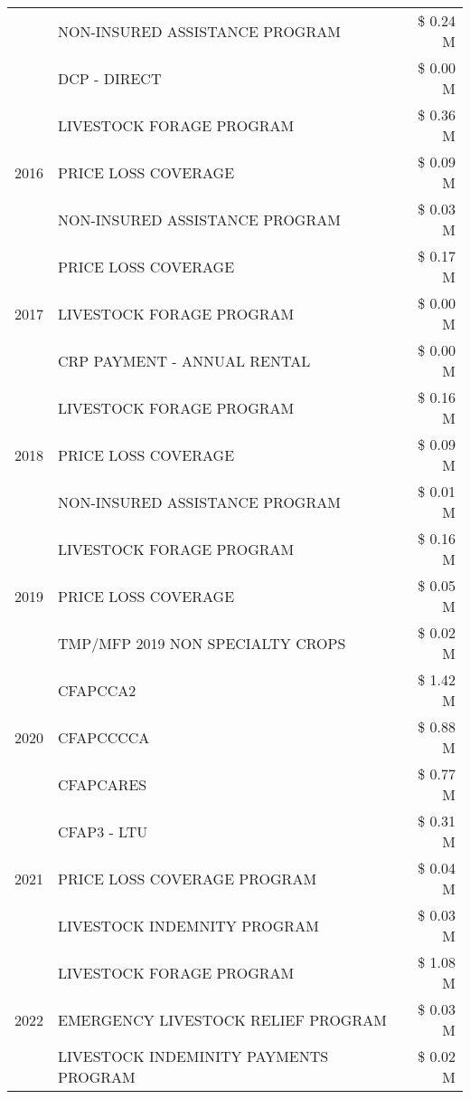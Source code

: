 \begin{tabular}{llr}
 & NON-INSURED ASSISTANCE PROGRAM & \$ 0.24 M \\
 & DCP - DIRECT & \$ 0.00 M \\
\cline{1-3}
\multirow[t]{3}{*}{2016} & LIVESTOCK FORAGE PROGRAM & \$ 0.36 M \\
 & PRICE LOSS COVERAGE & \$ 0.09 M \\
 & NON-INSURED ASSISTANCE PROGRAM & \$ 0.03 M \\
\cline{1-3}
\multirow[t]{3}{*}{2017} & PRICE LOSS COVERAGE & \$ 0.17 M \\
 & LIVESTOCK FORAGE PROGRAM & \$ 0.00 M \\
 & CRP PAYMENT - ANNUAL RENTAL & \$ 0.00 M \\
\cline{1-3}
\multirow[t]{3}{*}{2018} & LIVESTOCK FORAGE PROGRAM & \$ 0.16 M \\
 & PRICE LOSS COVERAGE & \$ 0.09 M \\
 & NON-INSURED ASSISTANCE PROGRAM & \$ 0.01 M \\
\cline{1-3}
\multirow[t]{3}{*}{2019} & LIVESTOCK FORAGE PROGRAM & \$ 0.16 M \\
 & PRICE LOSS COVERAGE & \$ 0.05 M \\
 & TMP/MFP 2019 NON SPECIALTY CROPS & \$ 0.02 M \\
\cline{1-3}
\multirow[t]{3}{*}{2020} & CFAPCCA2 & \$ 1.42 M \\
 & CFAPCCCCA & \$ 0.88 M \\
 & CFAPCARES & \$ 0.77 M \\
\cline{1-3}
\multirow[t]{3}{*}{2021} & CFAP3 - LTU & \$ 0.31 M \\
 & PRICE LOSS COVERAGE PROGRAM & \$ 0.04 M \\
 & LIVESTOCK INDEMNITY PROGRAM & \$ 0.03 M \\
\cline{1-3}
\multirow[t]{3}{*}{2022} & LIVESTOCK FORAGE PROGRAM & \$ 1.08 M \\
 & EMERGENCY LIVESTOCK RELIEF PROGRAM & \$ 0.03 M \\
 & LIVESTOCK INDEMINITY PAYMENTS PROGRAM & \$ 0.02 M \\
\cline{1-3}
\bottomrule
\end{tabular}
